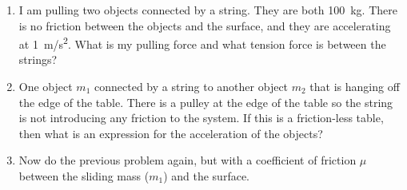 \begin{enumerate}
\item I am pulling two objects connected by a string. They are both \SI{100}{\kilogram}. There is no friction between the objects and the surface, and they are accelerating at \SI{1}{\meter/\second^2}. What is my pulling force and what tension force is between the strings?

\item One object $m_1$ connected by a string to another object $m_2$ that is hanging off the edge of the table. There is a pulley at the edge of the table so the string is not introducing any friction to the system. If this is a friction-less table, then what is an expression for the acceleration of the objects?

\item Now do the previous problem again, but with a coefficient of friction $\mu$ between the sliding mass ($m_1$) and the surface.



\end{enumerate}